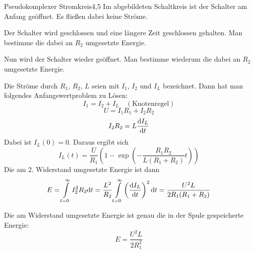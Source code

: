 \begin{problem}{Pseudokomplexer Stromkreis}{4,5}
Im abgebildeten Schaltkreis ist der Schalter am Anfang geöffnet. Es fließen dabei keine Ströme.
\begin{abcenum}
\item Der Schalter wird geschlossen und eine längere Zeit geschlossen gehalten. Man bestimme die dabei an $R_2$ umgesetzte Energie.
\item Nun wird der Schalter wieder geöffnet. Man bestimme wiederum die dabei an $R_2$ umgesetzte Energie.
\end{abcenum}

\begin{solution}
\begin{abcenum}
\item Die Ströme durch $R_1$, $R_2$, $L$ seien mit $I_1$, $I_2$ und $I_L$ bezeichnet. Dann hat man folgendes Anfangswertproblem zu Lösen:
\[
I_1 = I_2 + I_L \quad \mathrm{(Knotenregel)}
\]
\[
U = I_1 R_1 + I_2 R_2
\]
\[
I_2 R_2 = L \frac{\mathrm{d} I_L}{\mathrm{d} t}
\]
Dabei ist $I_L(0)=0$. Daraus ergibt sich
\[
I_L(t) = \frac{U}{R_1} \left( 1-\exp\left( -\frac{R_1 R_2}{L (R_1+R_2)} t \right) \right)
\]
Die am 2. Widerstand umgesetzte Energie ist dann
\[
E = \int\limits_{t=0}^{\infty} I_2^2 R_2 \mathrm{d} t
= \frac{L^2}{R_2} \int\limits_{t=0}^{\infty} \left( \frac{\mathrm{d} I_L}{\mathrm{d} t} \right)^2 \mathrm{d} t
= \frac{U^2 L}{2 R_1 (R_1+R_2)}
\]
\item Die am Widerstand umgesetzte Energie ist genau die in der Spule gespeicherte Energie:
\[
E = \frac{U^2 L}{2 R_1^2}
\]
\end{abcenum}
\end{solution}
\end{problem}

